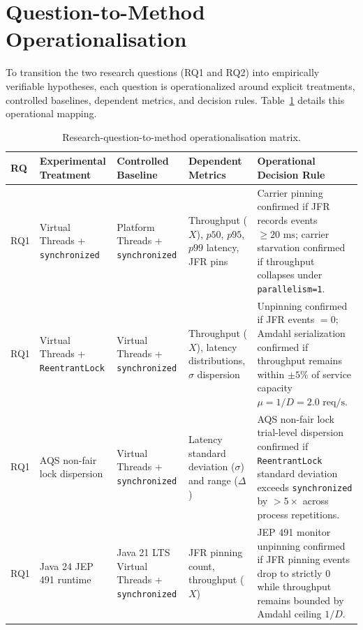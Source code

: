 \section{Question-to-Method Operationalisation}
\label{sec:rq-operationalisation}

To transition the two research questions (RQ1 and RQ2) into empirically verifiable hypotheses, each question is operationalized around explicit treatments, controlled baselines, dependent metrics, and decision rules. Table~\ref{tab:rq-method} details this operational mapping.

\begin{table}[htbp]
  \centering
  \footnotesize
  \renewcommand{\arraystretch}{0.95}
  \caption{Research-question-to-method operationalisation matrix.}
  \label{tab:rq-method}
  \begin{tabularx}{\textwidth}{@{}l>{\raggedright\arraybackslash}p{}>{\raggedright\arraybackslash}p{}>{\raggedright\arraybackslash}p{}>{\raggedright\arraybackslash}X@{}}
    \toprule
    \textbf{RQ} & \textbf{Experimental Treatment} & \textbf{Controlled Baseline} & \textbf{Dependent Metrics} & \textbf{Operational Decision Rule} \\
    \midrule
    RQ1 & Virtual Threads + \texttt{synchronized} & Platform Threads + \texttt{synchronized} & Throughput ($X$), $p50$, $p95$, $p99$ latency, JFR pins & Carrier pinning confirmed if JFR records events $\ge 20\text{ ms}$; carrier starvation confirmed if throughput collapses under \texttt{parallelism=1}. \\
    \addlinespace
    RQ1 & Virtual Threads + \texttt{ReentrantLock} & Virtual Threads + \texttt{synchronized} & Throughput ($X$), latency distributions, $\sigma$ dispersion & Unpinning confirmed if JFR events $= 0$; Amdahl serialization confirmed if throughput remains within $\pm 5\%$ of service capacity $\mu = 1/D = 2.0\text{ req/s}$. \\
    \addlinespace
    RQ1 & AQS non-fair lock dispersion & Virtual Threads + \texttt{synchronized} & Latency standard deviation ($\sigma$) and range ($\Delta$) & AQS non-fair lock trial-level dispersion confirmed if \texttt{ReentrantLock} standard deviation exceeds \texttt{synchronized} by $> 5\times$ across process repetitions. \\
    \addlinespace
    RQ1 & Java 24 JEP 491 runtime & Java 21 LTS Virtual Threads + \texttt{synchronized} & JFR pinning count, throughput ($X$) & JEP 491 monitor unpinning confirmed if JFR pinning events drop to strictly 0 while throughput remains bounded by Amdahl ceiling $1/D$. \\

\end{tabularx}
\end{table}
